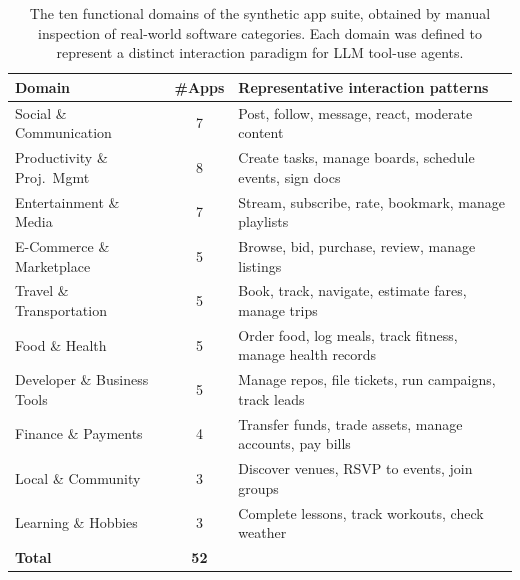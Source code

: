 \begin{table}[t]
\centering
\small
\setlength{\tabcolsep}{6pt}
\begin{tabular}{lcp{8.5cm}}
\toprule
\textbf{Domain} & \textbf{\#Apps} & \textbf{Representative interaction patterns} \\
\midrule
Social \& Communication      & 7 & Post, follow, message, react, moderate content \\
Productivity \& Proj.\ Mgmt  & 8 & Create tasks, manage boards, schedule events, sign docs \\
Entertainment \& Media       & 7 & Stream, subscribe, rate, bookmark, manage playlists \\
E-Commerce \& Marketplace    & 5 & Browse, bid, purchase, review, manage listings \\
Travel \& Transportation     & 5 & Book, track, navigate, estimate fares, manage trips \\
Food \& Health               & 5 & Order food, log meals, track fitness, manage health records \\
Developer \& Business Tools  & 5 & Manage repos, file tickets, run campaigns, track leads \\
Finance \& Payments          & 4 & Transfer funds, trade assets, manage accounts, pay bills \\
Local \& Community           & 3 & Discover venues, RSVP to events, join groups \\
Learning \& Hobbies          & 3 & Complete lessons, track workouts, check weather \\
\midrule
\textbf{Total}               & \textbf{52} & \\
\bottomrule
\end{tabular}
\caption{The ten functional domains of the synthetic app suite, obtained by manual inspection of real-world software categories. Each domain was defined to represent a distinct interaction paradigm for LLM tool-use agents.}
\label{tab:domains}
\end{table}



